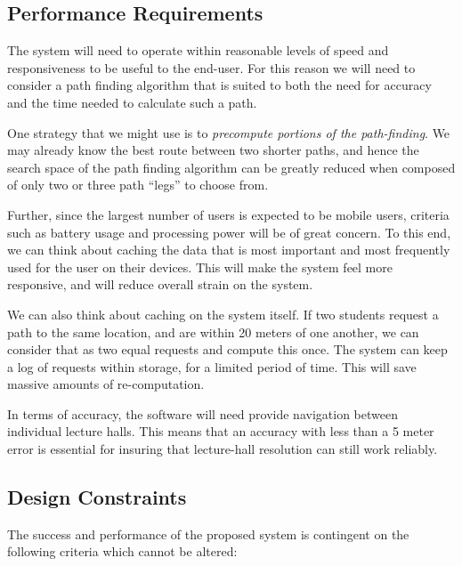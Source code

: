 \documentclass[12pt,a4paper]{article}
\begin{document}
		\subsection{Performance Requirements}

			The system will need to operate within reasonable levels of speed and
			responsiveness to be useful to the end-user. For this reason we will need
			to consider a path finding algorithm that is suited to both the need for
			accuracy and the time needed to calculate such a path.

			\medskip

			One strategy that we might use is to \textit{precompute portions of the
			path-finding}. We may already know the best route between two shorter
			paths, and hence the search space of the path finding algorithm can be
			greatly reduced when composed of only two or three path ``legs'' to choose
			from.

			\medskip

			Further, since the largest number of users is expected to be mobile users,
			criteria such as battery usage and processing power will be of
			great concern. To this end, we can think about caching the data that is
			most important and most frequently used for the user on their devices.
			This will make the system feel more responsive, and will reduce overall
			strain on the system.

			\medskip

			We can also think about caching on the system itself. If two students
			request a path to the same location, and are within 20 meters of one
			another, we can consider that as two equal requests and compute this once.
			The system can keep a log of requests within storage, for a limited period
			of time. This will save massive amounts of re-computation.

			\medskip

			In terms of accuracy, the software will need provide navigation between
			individual lecture halls. This means that an accuracy with less than a 5
			meter error is essential for insuring that lecture-hall resolution can
			still work reliably.

		\subsection{Design Constraints}

			The success and performance of the proposed system is contingent on the
			following criteria which cannot be altered:
\end{document}
